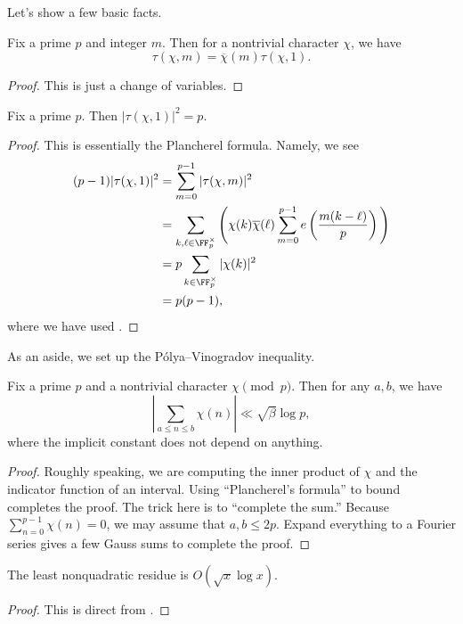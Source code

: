 \documentclass[../notes.tex]{subfiles}
\begin{document}
Let's show a few basic facts.
\begin{lemma}
	Fix a prime $p$ and integer $m$. Then for a nontrivial character $\chi$, we have
	\[\tau(\chi,m)=\overline\chi(m)\tau(\chi,1).\]
\end{lemma}
\begin{proof}
	This is just a change of variables.
\end{proof}
\begin{lemma}
	Fix a prime $p$. Then $|\tau(\chi,1)|^2=p$.
\end{lemma}
\begin{proof}
	This is essentially the Plancherel formula. Namely, we see
	\begin{align*}
		(p-1)|\tau(\chi,1)|^2 &= \sum_{m=0}^{p-1}|\tau(\chi,m)|^2 \\
		&= \sum_{k,\ell\in\FF_p^\times}\Bigg(\chi(k)\overline\chi(\ell)\sum_{m=0}^{p-1}e\left(\frac{m(k-\ell)}p\right)\Bigg) \\
		&= p\sum_{k\in\FF_p^\times}|\chi(k)|^2 \\
		&= p(p-1),
	\end{align*}
	where we have used .
\end{proof}
As an aside, we set up the P\'olya--Vinogradov inequality.
\begin{theorem} \label{thm:polya-vinogradov}
	Fix a prime $p$ and a nontrivial character $\chi\pmod p$. Then for any $a,b$, we have
	\[\left|\sum_{a\le n\le b}\chi(n)\right|\ll\sqrt\beta\log p,\]
	where the implicit constant does not depend on anything.
\end{theorem}
\begin{proof}
	Roughly speaking, we are computing the inner product of $\chi$ and the indicator function of an interval. Using ``Plancherel's formula'' to bound completes the proof. The trick here is to ``complete the sum.'' Because $\sum_{n=0}^{p-1}\chi(n)=0$, we may assume that $a,b\le2p$. Expand everything to a Fourier series gives a few Gauss sums to complete the proof.
\end{proof}
\begin{corollary}
	The least nonquadratic residue is $O(\sqrt x\log x)$.
\end{corollary}
\begin{proof}
	This is direct from .
\end{proof}
\end{document}
